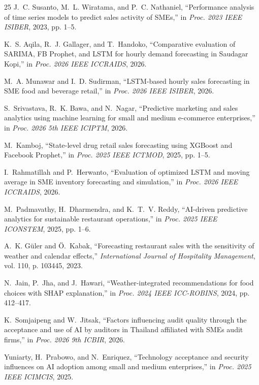 \documentclass[conference]{IEEEtran}
\begin{document}
\begin{thebibliography}{25}
J.~C. Susanto, M.~L. Wiratama, and P.~C. Nathaniel, ``Performance analysis of time series models to predict sales activity of SMEs,'' in \emph{Proc. 2023 IEEE ISIBER}, 2023, pp. 1--5.

K.~S. Aqila, R.~J. Gallager, and T.~Handoko, ``Comparative evaluation of SARIMA, FB Prophet, and LSTM for hourly demand forecasting in Saudagar Kopi,'' in \emph{Proc. 2026 IEEE ICCRAIDS}, 2026.

M.~A. Munawar and I.~D. Sudirman, ``LSTM-based hourly sales forecasting in SME food and beverage retail,'' in \emph{Proc. 2026 IEEE ISIBER}, 2026.

S.~Srivastava, R.~K. Bawa, and N.~Nagar, ``Predictive marketing and sales analytics using machine learning for small and medium e-commerce enterprises,'' in \emph{Proc. 2026 5th IEEE ICIPTM}, 2026.

M.~Kamboj, ``State-level drug retail sales forecasting using XGBoost and Facebook Prophet,'' in \emph{Proc. 2025 IEEE ICTMOD}, 2025, pp. 1--5.

I.~Rahmatillah and P.~Herwanto, ``Evaluation of optimized LSTM and moving average in SME inventory forecasting and simulation,'' in \emph{Proc. 2026 IEEE ICCRAIDS}, 2026.

M.~Padmavathy, H.~Dharmendra, and K.~T.~V. Reddy, ``AI-driven predictive analytics for sustainable restaurant operations,'' in \emph{Proc. 2025 IEEE ICONSTEM}, 2025, pp. 1--6.

A.~K. G{\"u}ler and {\"O}.~Kabak, ``Forecasting restaurant sales with the sensitivity of weather and calendar effects,'' \emph{International Journal of Hospitality Management}, vol. 110, p. 103445, 2023.

N.~Jain, P.~Jha, and J.~Hawari, ``Weather-integrated recommendations for food choices with SHAP explanation,'' in \emph{Proc. 2024 IEEE ICC-ROBINS}, 2024, pp. 412--417.

K.~Somjaipeng and W.~Jitsak, ``Factors influencing audit quality through the acceptance and use of AI by auditors in Thailand affiliated with SMEs audit firms,'' in \emph{Proc. 2026 9th ICBIR}, 2026.

Yuniarty, H.~Prabowo, and N.~Enriquez, ``Technology acceptance and security influences on AI adoption among small and medium enterprises,'' in \emph{Proc. 2025 IEEE ICIMCIS}, 2025.


\end{thebibliography}
\end{document}
